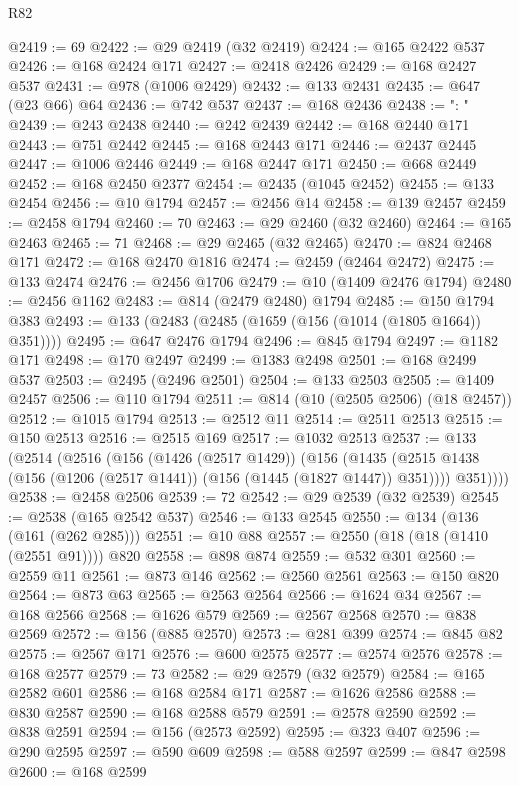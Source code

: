 \begin{lexlean}{R82}
\begin{coremodule}
@2419 := 69
@2422 := @29 @2419 (@32 @2419)
@2424 := @165 @2422 @537
@2426 := @168 @2424 @171
@2427 := @2418 @2426
@2429 := @168 @2427 @537
@2431 := @978 (@1006 @2429)
@2432 := @133 @2431
@2435 := @647 (@23 @66) @64
@2436 := @742 @537
@2437 := @168 @2436
@2438 := ": "
@2439 := @243 @2438
@2440 := @242 @2439
@2442 := @168 @2440 @171
@2443 := @751 @2442
@2445 := @168 @2443 @171
@2446 := @2437 @2445
@2447 := @1006 @2446
@2449 := @168 @2447 @171
@2450 := @668 @2449
@2452 := @168 @2450 @2377
@2454 := @2435 (@1045 @2452)
@2455 := @133 @2454
@2456 := @10 @1794
@2457 := @2456 @14
@2458 := @139 @2457
@2459 := @2458 @1794
@2460 := 70
@2463 := @29 @2460 (@32 @2460)
@2464 := @165 @2463
@2465 := 71
@2468 := @29 @2465 (@32 @2465)
@2470 := @824 @2468 @171
@2472 := @168 @2470 @1816
@2474 := @2459 (@2464 @2472)
@2475 := @133 @2474
@2476 := @2456 @1706
@2479 := @10 (@1409 @2476 @1794)
@2480 := @2456 @1162
@2483 := @814 (@2479 @2480) @1794
@2485 := @150 @1794 @383
@2493 := @133 (@2483 (@2485 (@1659 (@156 (@1014 (@1805 @1664)) @351))))
@2495 := @647 @2476 @1794
@2496 := @845 @1794
@2497 := @1182 @171
@2498 := @170 @2497
@2499 := @1383 @2498
@2501 := @168 @2499 @537
@2503 := @2495 (@2496 @2501)
@2504 := @133 @2503
@2505 := @1409 @2457
@2506 := @110 @1794
@2511 := @814 (@10 (@2505 @2506) (@18 @2457))
@2512 := @1015 @1794
@2513 := @2512 @11
@2514 := @2511 @2513
@2515 := @150 @2513
@2516 := @2515 @169
@2517 := @1032 @2513
@2537 := @133
    (@2514
      (@2516
        (@156
          (@1426 (@2517 @1429))
          (@156
            (@1435 (@2515 @1438 (@156 (@1206 (@2517 @1441)) (@156 (@1445 (@1827 @1447)) @351))))
            @351))))
@2538 := @2458 @2506
@2539 := 72
@2542 := @29 @2539 (@32 @2539)
@2545 := @2538 (@165 @2542 @537)
@2546 := @133 @2545
@2550 := @134 (@136 (@161 (@262 @285)))
@2551 := @10 @88
@2557 := @2550 (@18 (@18 (@1410 (@2551 @91)))) @820
@2558 := @898 @874
@2559 := @532 @301
@2560 := @2559 @11
@2561 := @873 @146
@2562 := @2560 @2561
@2563 := @150 @820
@2564 := @873 @63
@2565 := @2563 @2564
@2566 := @1624 @34
@2567 := @168 @2566
@2568 := @1626 @579
@2569 := @2567 @2568
@2570 := @838 @2569
@2572 := @156 (@885 @2570)
@2573 := @281 @399
@2574 := @845 @82
@2575 := @2567 @171
@2576 := @600 @2575
@2577 := @2574 @2576
@2578 := @168 @2577
@2579 := 73
@2582 := @29 @2579 (@32 @2579)
@2584 := @165 @2582 @601
@2586 := @168 @2584 @171
@2587 := @1626 @2586
@2588 := @830 @2587
@2590 := @168 @2588 @579
@2591 := @2578 @2590
@2592 := @838 @2591
@2594 := @156 (@2573 @2592)
@2595 := @323 @407
@2596 := @290 @2595
@2597 := @590 @609
@2598 := @588 @2597
@2599 := @847 @2598
@2600 := @168 @2599

\end{coremodule}
\end{lexlean}
